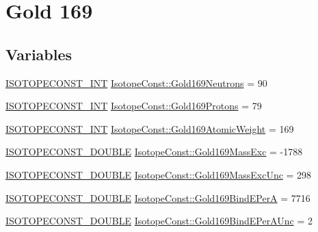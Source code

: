 \hypertarget{group___isotope_const-_gold-_au169}{}\section{Gold 169}
\label{group___isotope_const-_gold-_au169}
\subsection*{Variables}
\begin{DoxyCompactItemize}
\item 
\mbox{\hyperlink{group___isotope_const-_macros_ga5f18360b3e99483a35c32d789e62621c}{I\+S\+O\+T\+O\+P\+E\+C\+O\+N\+S\+T\+\_\+\+I\+NT}} \mbox{\hyperlink{group___isotope_const-_gold-_au169_ga2fec4082956b1caeadfb2eba8e38cbb3}{Isotope\+Const\+::\+Gold169\+Neutrons}} = 90
\item 
\mbox{\hyperlink{group___isotope_const-_macros_ga5f18360b3e99483a35c32d789e62621c}{I\+S\+O\+T\+O\+P\+E\+C\+O\+N\+S\+T\+\_\+\+I\+NT}} \mbox{\hyperlink{group___isotope_const-_gold-_au169_ga7517995325596df319279675a0a223ff}{Isotope\+Const\+::\+Gold169\+Protons}} = 79
\item 
\mbox{\hyperlink{group___isotope_const-_macros_ga5f18360b3e99483a35c32d789e62621c}{I\+S\+O\+T\+O\+P\+E\+C\+O\+N\+S\+T\+\_\+\+I\+NT}} \mbox{\hyperlink{group___isotope_const-_gold-_au169_gacc3a148b7342307b361115ccb1278132}{Isotope\+Const\+::\+Gold169\+Atomic\+Weight}} = 169
\item 
\mbox{\hyperlink{group___isotope_const-_macros_ga8f45a7272ce02c0b4c65c44636ed719a}{I\+S\+O\+T\+O\+P\+E\+C\+O\+N\+S\+T\+\_\+\+D\+O\+U\+B\+LE}} \mbox{\hyperlink{group___isotope_const-_gold-_au169_gae5dd3caaffc5e92e669c27a6a63ff399}{Isotope\+Const\+::\+Gold169\+Mass\+Exc}} = -\/1788
\item 
\mbox{\hyperlink{group___isotope_const-_macros_ga8f45a7272ce02c0b4c65c44636ed719a}{I\+S\+O\+T\+O\+P\+E\+C\+O\+N\+S\+T\+\_\+\+D\+O\+U\+B\+LE}} \mbox{\hyperlink{group___isotope_const-_gold-_au169_ga090472391ca29d15e578045e8e368499}{Isotope\+Const\+::\+Gold169\+Mass\+Exc\+Unc}} = 298
\item 
\mbox{\hyperlink{group___isotope_const-_macros_ga8f45a7272ce02c0b4c65c44636ed719a}{I\+S\+O\+T\+O\+P\+E\+C\+O\+N\+S\+T\+\_\+\+D\+O\+U\+B\+LE}} \mbox{\hyperlink{group___isotope_const-_gold-_au169_ga8abc6f24b75f3edd566a0cc9ea059181}{Isotope\+Const\+::\+Gold169\+Bind\+E\+PerA}} = 7716
\item 
\mbox{\hyperlink{group___isotope_const-_macros_ga8f45a7272ce02c0b4c65c44636ed719a}{I\+S\+O\+T\+O\+P\+E\+C\+O\+N\+S\+T\+\_\+\+D\+O\+U\+B\+LE}} \mbox{\hyperlink{group___isotope_const-_gold-_au169_gaa20585686fed603a8f11d1d367d6dcc3}{Isotope\+Const\+::\+Gold169\+Bind\+E\+Per\+A\+Unc}} = 2

\end{DoxyCompactItemize}
